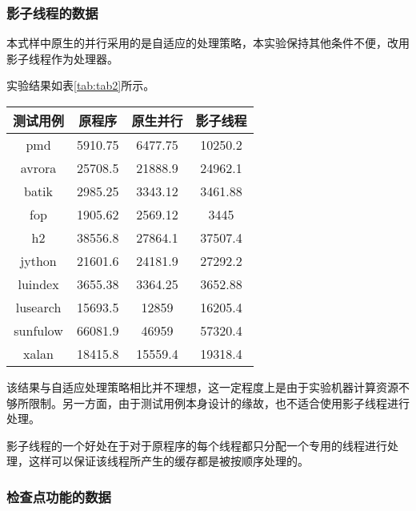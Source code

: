\subsubsection{影子线程的数据}

本式样中原生的并行采用的是自适应的处理策略，本实验保持其他条件不便，改用影子线程作为处理器。

实验结果如表\ref{tab:tab2}所示。

\begin{table}[htbp]
	\centering
	\begin{tabular}{c|c|c|c}
		\hline
		测试用例 & 原程序 & 原生并行 & 影子线程 \\
		\hline
		pmd & 5910.75 & 6477.75 & 10250.2 \\
		\hline
		avrora & 25708.5 & 21888.9 & 24962.1 \\
		\hline
		batik & 2985.25 & 3343.12 & 3461.88 \\
		\hline
		fop & 1905.62 & 2569.12 & 3445 \\
		\hline
		h2 & 38556.8 & 27864.1 & 37507.4 \\
		\hline
		jython & 21601.6 & 24181.9 & 27292.2 \\
		\hline
		luindex & 3655.38 & 3364.25 & 3652.88 \\
		\hline
		lusearch & 15693.5 & 12859 & 16205.4 \\
		\hline
		sunfulow & 66081.9 & 46959 & 57320.4 \\
		\hline
		xalan & 18415.8 & 15559.4 & 19318.4 \\
		\hline
	\end{tabular}
\end{table}

该结果与自适应处理策略相比并不理想，这一定程度上是由于实验机器计算资源不够所限制。另一方面，由于测试用例本身设计的缘故，也不适合使用影子线程进行处理。

影子线程的一个好处在于对于原程序的每个线程都只分配一个专用的线程进行处理，这样可以保证该线程所产生的缓存都是被按顺序处理的。

\subsubsection{检查点功能的数据}

